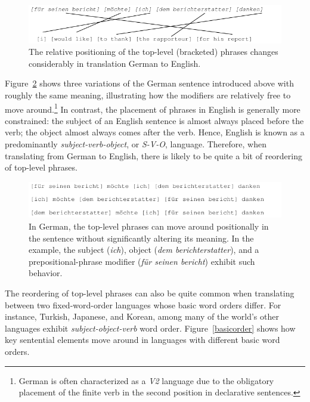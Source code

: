\documentclass[10pt]{report}
\theoremstyle{plain}
\begin{document}
{\begin{figure}
\centering
\includegraphics[scale=1]{brooke-movement}
\caption{The relative positioning of the top-level (bracketed) phrases
changes considerably in translation German to English.}
\label{movement}
\end{figure}

Figure~\ref{freeorder} shows three variations of the German sentence
introduced above with roughly the same meaning, illustrating how the
modifiers are relatively free to move around.\footnote{German is often
characterized as a {\em V2} language due to the obligatory placement
of the finite verb in the second position in declarative sentences.}
In contrast, the placement of phrases in English is generally more
constrained: the subject of an English sentence is almost always
placed before the verb; the object almost always comes after the
verb. Hence, English is known as a predominantly {\em
subject-verb-object}, or {\em S-V-O}, language. Therefore, when
translating from German to English, there is likely to be quite a bit
of reordering of top-level phrases.

\begin{figure}
\centering
\includegraphics[scale=1]{brooke-freeorder}
\caption{In German, the top-level phrases can move around positionally
in the sentence without significantly altering its meaning. In the
example, the subject ({\em ich}), object ({\em dem berichterstatter}),
and a prepositional-phrase modifier ({\em f\"{u}r seinen bericht})
exhibit such behavior.}
\label{freeorder}
\end{figure}

The reordering of top-level phrases can also be quite common when
translating between two fixed-word-order languages whose basic word
orders differ. For instance, Turkish, Japanese, and Korean, among many
of the world's other languages exhibit {\em subject-object-verb} word
order. Figure~\ref{basicorder} shows how key sentential elements move
around in languages with different basic word orders.

}
\end{document}
